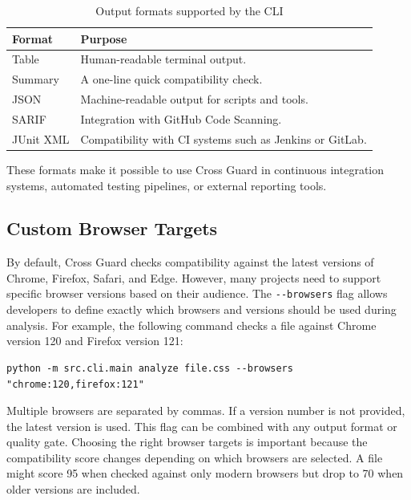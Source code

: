 \begin{table}[H]
    \centering
    \begin{tabular}{|l|l|}
        \hline
        \textbf{Format} & \textbf{Purpose} \\
        \hline \hline
        Table     & Human-readable terminal output. \\ \hline
        Summary   & A one-line quick compatibility check. \\ \hline
        JSON      & Machine-readable output for scripts and tools. \\ \hline
        SARIF     & Integration with GitHub Code Scanning. \\ \hline
        JUnit XML & Compatibility with CI systems such as Jenkins or GitLab. \\ \hline
    \end{tabular}
    \caption{Output formats supported by the CLI}
    \label{tab:cli-formats}
\end{table}

These formats make it possible to use Cross Guard in continuous integration systems, automated testing pipelines, or external reporting tools.

\subsection{Custom Browser Targets}

By default, Cross Guard checks compatibility against the latest versions of Chrome, Firefox, Safari, and Edge. However, many projects need to support specific browser versions based on their audience. The \texttt{-{}-browsers} flag allows developers to define exactly which browsers and versions should be used during analysis. For example, the following command checks a file against Chrome version 120 and Firefox version 121:

\begin{lstlisting}[caption={Analyze against specific browser versions}, basicstyle=\ttfamily\small]
python -m src.cli.main analyze file.css --browsers "chrome:120,firefox:121"
\end{lstlisting}

Multiple browsers are separated by commas. If a version number is not provided, the latest version is used. This flag can be combined with any output format or quality gate. Choosing the right browser targets is important because the compatibility score changes depending on which browsers are selected. A file might score 95 when checked against only modern browsers but drop to 70 when older versions are included.
\newpage
